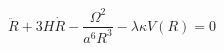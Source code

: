 \begin{equation}\label{sys3}
\ddot{R}+3H\dot{R}-\frac{\Omega^2}{a^6R^3}-\lambda\kappa V(R)=0
\end{equation}

